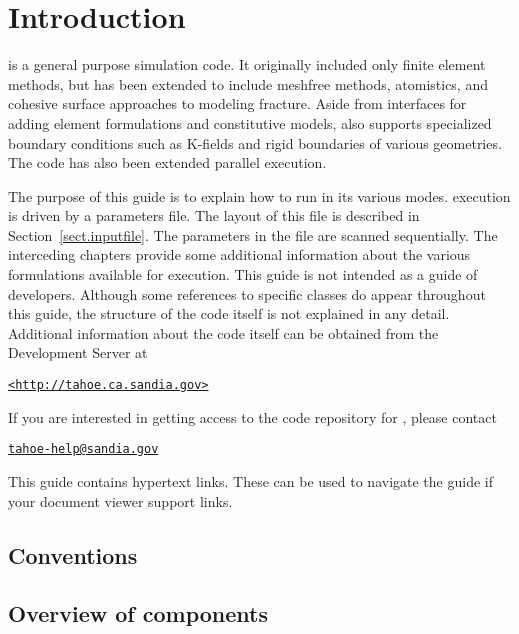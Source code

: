 
\section{Introduction}
\tahoe is a general purpose simulation code.  It originally included only
finite element methods, but has been extended to include meshfree methods,
atomistics, and cohesive surface approaches to modeling fracture.  Aside
from interfaces for adding element formulations and constitutive models,
\tahoe also supports specialized boundary conditions such as K-fields and
rigid boundaries of various geometries.  The code has also been extended
parallel execution.

The purpose of this guide is to explain how to run \tahoe in its various
modes.  \tahoe execution is driven by a parameters file.  The layout of this
file is described in Section~\ref{sect.inputfile}.  
The parameters in the file are scanned
sequentially.  The interceding chapters provide some additional information
about the various formulations available for execution.  This guide is not
intended as a guide of developers.  Although some references to specific
classes do appear throughout this guide, the structure of the code itself
is not explained in any detail.  Additional information about the code
itself can be obtained from the \tahoe Development Server at
\begin{center}
\href{http://tahoe.ca.sandia.gov}{\texttt{\textless http://tahoe.ca.sandia.gov\textgreater}}
\end{center}
If you are interested in getting access to the code repository for \tahoe, please contact
\begin{center}
\href{mailto:tahoe-help@sandia.gov}{\texttt{tahoe-help@sandia.gov}}
\end{center}
This guide contains hypertext links.  These can be used to navigate the
guide if your document viewer support links.

\subsection{Conventions}

\subsection{Overview of \tahoe components}
